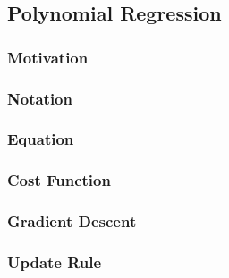 
\subsection{Polynomial Regression}
\label{ssec:polynomial_regression}

\subsubsection{Motivation}
\label{sssec:motivation}



\subsubsectionend
\subsubsection{Notation}
\label{sssec:notation}



\subsubsectionend
\subsubsection{Equation}
\label{sssec:equation}



\subsubsectionend
\subsubsection{Cost Function}
\label{sssec:cost_function}



\subsubsectionend
\subsubsection{Gradient Descent}
\label{sssec:gradient_descent}



\subsubsectionend
\subsubsection{Update Rule}
\label{sssec:update_rule}



\subsubsectionend

